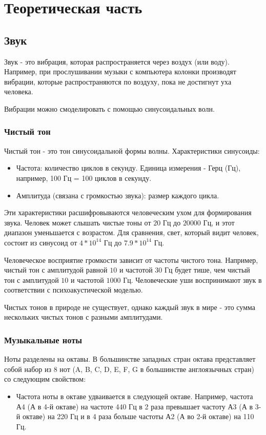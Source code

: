 \chapter{Теоретическая часть}
\label{cha:ch_1}

\section{Звук}
Звук - это вибрация, которая распространяется через воздух (или воду).
Например, при прослушивании музыки с компьютера колонки производят вибрации,
которые распространяются по воздуху, пока не достигнут уха человека.

Вибрации можно смоделировать с помощью синусоидальных волн.

\subsection{Чистый тон}
Чистый тон - это тон синусоидальной формы волны. Характеристики синусоиды:
\begin{itemize}
    \item Частота: количество циклов в секунду. Единица измерения - Герц (Гц), например, 100 Гц = 100 циклов в секунду.
    \item Амплитуда (связана с громкостью звука): размер каждого цикла.
\end{itemize}

Эти характеристики расшифровываются человеческим ухом для формирования звука.
Человек может слышать чистые тоны от $20$ Гц до $20 000$ Гц,
и этот диапазон уменьшается с возрастом. Для сравнения, свет, который видит человек,
состоит из синусоид от $4 * 10^{14}$ Гц до $7.9 * 10^{14}$ Гц.

Человеческое восприятие громкости зависит от частоты чистого тона.
Например, чистый тон с амплитудой равной $10$ и частотой $30$ Гц будет тише,
чем чистый тон с амплитудой $10$ и частотой $1000$ Гц.
Человеческие уши воспринимают звук в соответствии с психоакустической моделью.

Чистых тонов в природе не существует, однако каждый звук в мире - это сумма
нескольких чистых тонов с разными амплитудами.

\subsection{Музыкальные ноты}
Ноты разделены на октавы. В большинстве западных стран октава представляет
собой набор из 8 нот (A, B, C, D, E, F, G в большинстве англоязычных
стран) со следующим свойством:
\begin{itemize}
    \item Частота ноты в октаве удваивается в следующей октаве.
    Например, частота А4 (А в 4-й октаве) на частоте 440 Гц в 2 раза
    превышает частоту А3 (А в 3-й октаве) на 220 Гц и в 4 раза больше
    частоты А2 (А во 2-й октаве) на 110 Гц.
\end{itemize}

